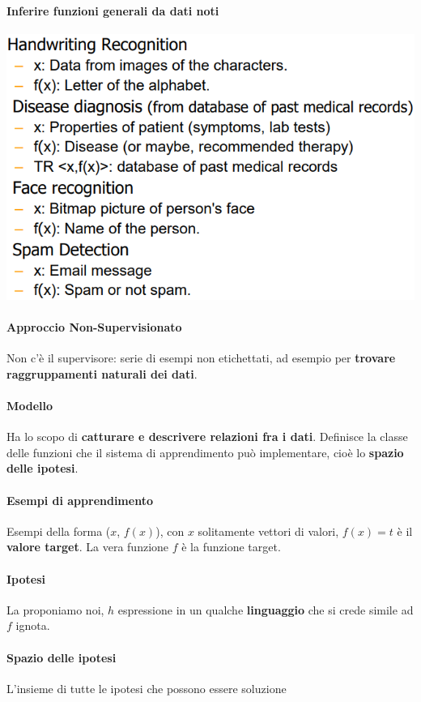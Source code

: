 \documentclass[10pt]{book}
\begin{document}
\paragraph{Inferire funzioni generali da dati noti}
\begin{center}
	\includegraphics[scale=0.7]{ml3.png}
\end{center}
\paragraph{Approccio Non-Supervisionato} Non c'è il supervisore: serie di esempi non etichettati, ad esempio per \textbf{trovare raggruppamenti naturali dei dati}.
\paragraph{Modello} Ha lo scopo di \textbf{catturare e descrivere relazioni fra i dati}. Definisce la classe delle funzioni che il sistema di apprendimento può implementare, cioè lo \textbf{spazio delle ipotesi}.
\paragraph{Esempi di apprendimento} Esempi della forma ($x$, $f(x)$), con $x$ solitamente vettori di valori, $f(x) = t$ è il \textbf{valore target}. La vera funzione $f$ è la funzione target.
\paragraph{Ipotesi} La proponiamo noi, $h$ espressione in un qualche \textbf{linguaggio} che si crede simile ad $f$ ignota.
\paragraph{Spazio delle ipotesi} L'insieme di tutte le ipotesi che possono essere soluzione
\end{document}
